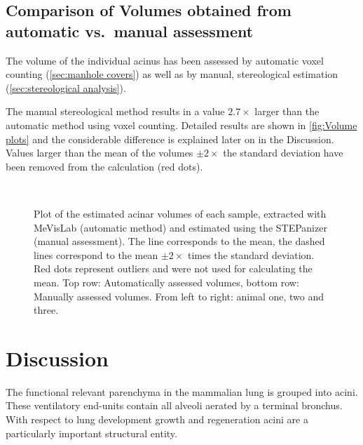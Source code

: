 \documentclass[paper=a4,DIV=calc,abstract,english]{scrartcl}
\newcommand{\imsize}{\linewidth}
\newcommand{\biggerthan}{2\xspace} %
\newcommand{\difference}{2.7\xspace} %
\begin{document}
\subsection{Comparison of Volumes obtained from automatic vs.\ manual assessment}
The volume of the individual acinus has been assessed by automatic voxel counting (\autoref{sec:manhole covers}) as well as by manual, stereological estimation (\autoref{sec:stereological analysis}).

The manual stereological method results in a value \(\difference\times\) larger than the automatic method using voxel counting.
Detailed results are shown in \autoref{fig:Volume plots} and the considerable difference is explained later on in the Discussion.
Values larger than the mean of the volumes \(\pm\biggerthan\times\) the standard deviation have been removed from the calculation (red dots).

\renewcommand{\imsize}{0.35\textwidth}
\begin{figure}[htb]
	\centering
	\subfloat{
		}\hfill%
	\subfloat{
		
		}\hfill%
	\subfloat{
		
		}\\%
	\subfloat{
		
		}\hfill%
	\subfloat{
		
		}\hfill%
	\subfloat{
		
		}%
	\caption{Plot of the estimated acinar volumes of each sample, extracted with MeVisLab (automatic method) and estimated using the STEPanizer (manual assessment).
		The line corresponds to the mean, the dashed lines correspond to the mean $\pm\biggerthan\times$ times the standard deviation.
		Red dots represent outliers and were not used for calculating the mean.
		Top row: Automatically assessed volumes, bottom row: Manually assessed volumes.
		From left to right: animal one, two and three.}
	\label{fig:Volume plots}
\end{figure}

\section{Discussion}\label{sec:discussion}
The functional relevant parenchyma in the mammalian lung is grouped into acini.
These ventilatory end-units contain all alveoli aerated by a terminal bronchus.
With respect to lung development growth and regeneration acini are a particularly important structural entity.
\end{document}
